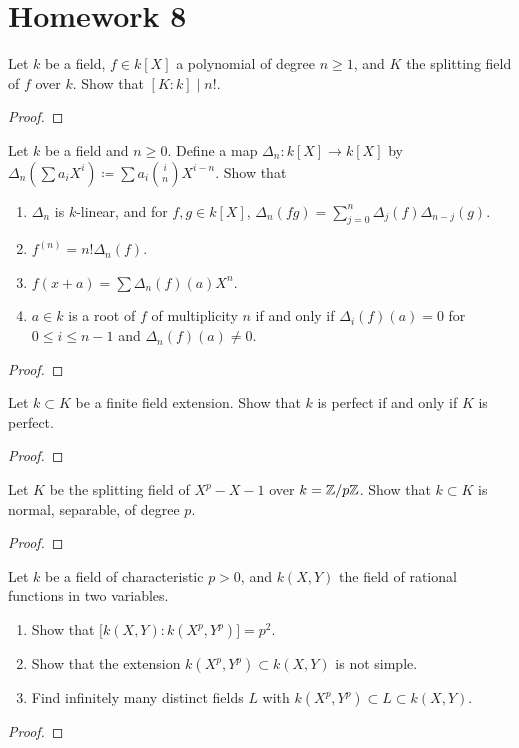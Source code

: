 \section{Homework 8}
\setcounter{exercise}{0}
\setcounter{equation}{0}
\begin{problem}
Let $k$ be a field, $f\in k[X]$ a polynomial of degree $n\geq 1$, and $K$
the splitting field of $f$ over $k$. Show that $[K:k]\mid n!$.
\end{problem}
\begin{proof}
\end{proof}

\begin{problem}
Let $k$ be a field and $n\geq 0$. Define a map $\Delta_n\colon k[X]\to
k[X]$ by $\Delta_n\left(\sum a_iX^i\right)\coloneqq\sum a_i\binom{i}{n}
X^{i-n}$. Show that
\begin{enumerate}[label=(\alph*)]
\item $\Delta_n$ is $k$-linear, and for $f,g\in k[X]$,
  $\Delta_n(fg)=\sum_{j=0}^n\Delta_j(f)\Delta_{n-j}(g)$.
\item $f^{(n)}=n!\Delta_n(f)$.
\item $f(x+a)=\sum\Delta_n(f)(a)X^n$.
\item $a\in k$ is a root of $f$ of multiplicity $n$ if and only if
  $\Delta_i(f)(a)=0$ for $0\leq i\leq n-1$ and $\Delta_n(f)(a)\neq 0$.
\end{enumerate}
\end{problem}
\begin{proof}
\end{proof}

\begin{problem}
Let $k\subset K$ be a finite field extension. Show that $k$ is perfect if
and only if $K$ is perfect.
\end{problem}
\begin{proof}
\end{proof}

\begin{problem}
Let $K$ be the splitting field of $X^p-X-1$ over $k=\mathbb{Z}/p\mathbb{Z}$. Show that
$k\subset K$ is normal, separable, of degree $p$.
\end{problem}
\begin{proof}
\end{proof}

\begin{problem}
Let $k$ be a field of characteristic $p>0$, and $k(X,Y)$ the field of
rational functions in two variables.
\begin{enumerate}[label=(\alph*)]
\item Show that $\bigl[k(X,Y):k(X^p,Y^p)\bigr]=p^2$.
\item Show that the extension $k(X^p,Y^p)\subset k(X,Y)$ is not simple.
\item Find infinitely many distinct fields $L$ with $k(X^p,Y^p)\subset
  L\subset k(X,Y)$.
\end{enumerate}
\end{problem}
\begin{proof}
\end{proof}

